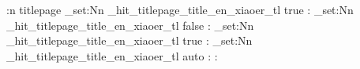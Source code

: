 
\makeatletter
\ExplSyntaxOn
\hitif[lang=en]{\bilingualswapon}{\bilingualswapoff}
\hit@layout@push@part:n { titlepage }
\tl_set:Nn \g_hit_titlepage_title_en_xiaoer_tl { true }
\hit@titlepage@en@title:
\tl_set:Nn \g_hit_titlepage_title_en_xiaoer_tl { false }
\hit@titlepage@en@title:
\tl_set:Nn \g_hit_titlepage_title_en_xiaoer_tl { true }
\hit@titlepage@en@title:
\tl_set:Nn \g_hit_titlepage_title_en_xiaoer_tl { auto }
\hit@titlepage@en@title:
\hit@layout@pop@part:
\ExplSyntaxOff
\makeatother

